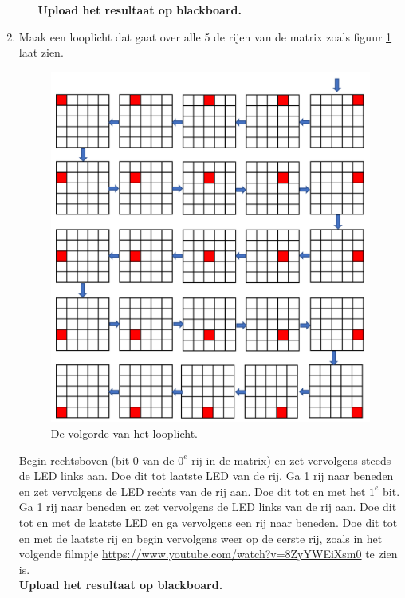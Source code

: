 \begin{enumerate}
\begin{enumerate}
\textbf{Upload het resultaat op blackboard.}
\end{enumerate}
\item Maak een looplicht dat gaat over alle 5 de rijen van de matrix zoals figuur \ref{fig:loopl} laat zien.

\begin{figure}[h!]
	\captionsetup{justification=centering}
\includegraphics[width=0.6 \linewidth]{figuren/looplicht}
\centering
\caption{De volgorde van het looplicht.}
\label{fig:loopl}
\end{figure}

Begin rechtsboven (bit 0 van de ${0^{e}}$ rij in de matrix) en zet vervolgens steeds de LED links aan. Doe dit tot laatste LED van de rij.
Ga 1 rij naar beneden en zet vervolgens de LED rechts van de rij aan. Doe dit tot en met het $1^{e}$ bit.
Ga 1 rij naar beneden en zet vervolgens de LED links van de rij aan. Doe dit tot en met de laatste LED en ga vervolgens een rij naar beneden.
Doe dit tot en met de laatste rij en begin vervolgens weer op de eerste rij, zoals in het volgende filmpje \href{
	https://youtube.com/8ZyYWEiXsm0}{https://www.youtube.com/watch?v=8ZyYWEiXsm0} te zien is.\\
\textbf{Upload het resultaat op blackboard.}
\end{enumerate}
